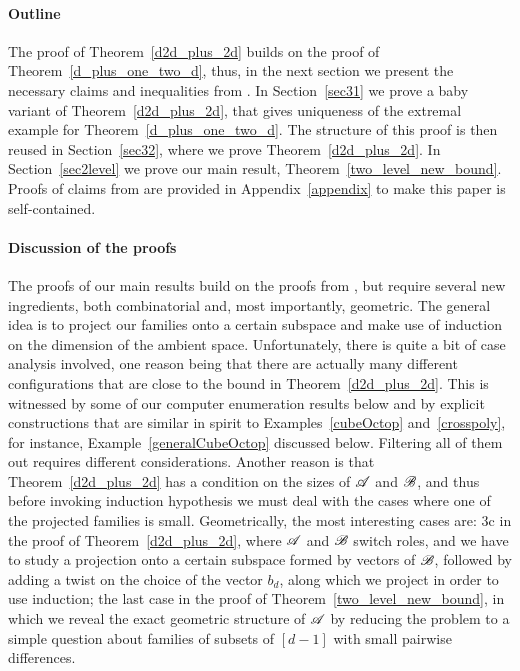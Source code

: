 \paragraph{Outline}
The proof of Theorem~\ref{d2d_plus_2d} builds on the proof of Theorem~\ref{d_plus_one_two_d}, thus, in the next section we present the necessary claims and inequalities from \cite{kupavskii22}. In Section~\ref{sec31} we prove a baby variant of Theorem~\ref{d2d_plus_2d}, that gives uniqueness of the extremal example for Theorem~\ref{d_plus_one_two_d}. The structure of this proof is then reused in Section~\ref{sec32}, where we prove Theorem~\ref{d2d_plus_2d}. In Section~\ref{sec2level} we prove our main result, Theorem~\ref{two_level_new_bound}.
Proofs of claims from \cite{kupavskii22} are provided in Appendix~\ref{appendix} to make this paper is self-contained.

\paragraph{Discussion of the proofs} The proofs of our main results build on the proofs from \cite{kupavskii22}, but require several new ingredients, both combinatorial and, most importantly, geometric. The general idea is to project our families onto a certain subspace and make use of induction on the dimension of the ambient space. Unfortunately, there is quite a bit of case analysis involved, one reason being that there are actually many different configurations that are close to the bound in Theorem~\ref{d2d_plus_2d}. This is witnessed by some of our computer enumeration results below and by explicit constructions that are similar in spirit to Examples~\ref{cubeOctop} and~\ref{crosspoly}, for instance, Example~\ref{generalCubeOctop} discussed below. Filtering all of them out requires different considerations. Another reason is that Theorem~\ref{d2d_plus_2d} has a condition on the sizes of ${\mathscr{A}}$ and ${\mathscr{B}}$, and thus before invoking induction hypothesis we must deal with the cases where one of the projected families is small. Geometrically, the most interesting cases are: 3c in the proof of Theorem~\ref{d2d_plus_2d}, where ${\mathscr{A}}$ and ${\mathscr{B}}$ switch roles, and we have to study a projection onto a certain subspace formed by vectors of ${\mathscr{B}}$, followed by adding a twist on the choice of the vector $b_d$, along which we project in order to use induction; the last case in the proof of Theorem~\ref{two_level_new_bound}, in which we reveal the exact geometric structure of ${\mathscr{A}}$ by reducing the problem to a simple question about families of subsets of $[d-1]$ with small pairwise differences.  


